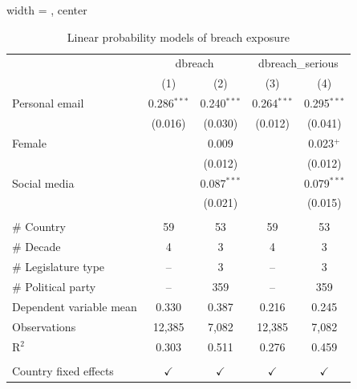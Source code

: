 \begin{table}[!htbp]
\centering
\caption{Linear probability models of breach exposure}
\label{tab:breach_lpm}
\begingroup
\centering
\begin{adjustbox}{width = \textwidth, center}
   \begin{tabular}{lcccc}
      \toprule
       & \multicolumn{2}{c}{dbreach} & \multicolumn{2}{c}{dbreach\_serious}\\
                                     & (1)           & (2)           & (3)           & (4)\\  
      \midrule 
      Personal email                 & 0.286$^{***}$ & 0.240$^{***}$ & 0.264$^{***}$ & 0.295$^{***}$\\   
                                     & (0.016)       & (0.030)       & (0.012)       & (0.041)\\   
      Female                         &               & 0.009         &               & 0.023$^{+}$\\   
                                     &               & (0.012)       &               & (0.012)\\   
      Social media                   &               & 0.087$^{***}$ &               & 0.079$^{***}$\\   
                                     &               & (0.021)       &               & (0.015)\\   
       \\
      \# Country                     & 59            & 53            & 59            & 53\\  
      \# Decade                      & 4             & 3             & 4             & 3\\  
      \# Legislature type            & --            & 3             & --            & 3\\  
      \# Political party             & --            & 359           & --            & 359\\  
      Dependent variable mean        & 0.330         & 0.387         & 0.216         & 0.245\\  
      Observations                   & 12,385        & 7,082         & 12,385        & 7,082\\  
      R$^2$                          & 0.303         & 0.511         & 0.276         & 0.459\\  
       \\
      Country fixed effects          & $\checkmark$  & $\checkmark$  & $\checkmark$  & $\checkmark$\\   

\end{tabular}
\end{adjustbox}
\end{table}
